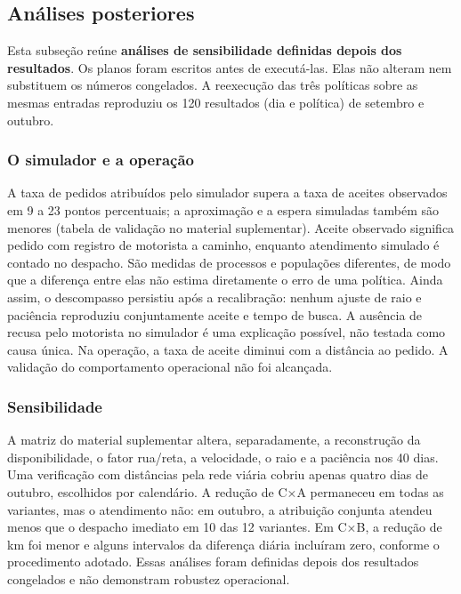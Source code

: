 \subsection{Análises posteriores}\label{sec:validade}

Esta subseção reúne \textbf{análises de sensibilidade definidas depois dos resultados}. Os planos foram escritos antes de executá-las. Elas não alteram nem substituem os números congelados. A reexecução das três políticas sobre as mesmas entradas reproduziu os 120 resultados (dia e política) de setembro e outubro.

\subsubsection*{O simulador e a operação}

A taxa de pedidos atribuídos pelo simulador supera a taxa de aceites observados em 9 a 23 pontos percentuais; a aproximação e a espera simuladas também são menores (tabela de validação no material suplementar). Aceite observado significa pedido com registro de motorista a caminho, enquanto atendimento simulado é contado no despacho. São medidas de processos e populações diferentes, de modo que a diferença entre elas não estima diretamente o erro de uma política. Ainda assim, o descompasso persistiu após a recalibração: nenhum ajuste de raio e paciência reproduziu conjuntamente aceite e tempo de busca. A ausência de recusa pelo motorista no simulador é uma explicação possível, não testada como causa única. Na operação, a taxa de aceite diminui com a distância ao pedido. A validação do comportamento operacional não foi alcançada.

\subsubsection*{Sensibilidade}

A matriz do material suplementar altera, separadamente, a reconstrução da disponibilidade, o fator rua/reta, a velocidade, o raio e a paciência nos 40 dias. Uma verificação com distâncias pela rede viária cobriu apenas quatro dias de outubro, escolhidos por calendário. A redução de C×A permaneceu em todas as variantes, mas o atendimento não: em outubro, a atribuição conjunta atendeu menos que o despacho imediato em 10 das 12 variantes. Em C×B, a redução de km foi menor e alguns intervalos da diferença diária incluíram zero, conforme o procedimento adotado. Essas análises foram definidas depois dos resultados congelados e não demonstram robustez operacional.

